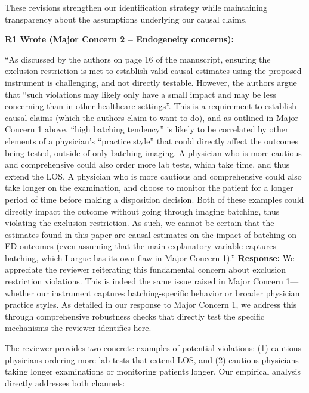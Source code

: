 \documentclass[11pt]{article}
\newenvironment{quote2}
{ \bigskip
\noindent
         \small\em
         \baselineskip=14pt
}
\newcommand{\1}{\hbox{\rm 1\kern-.35em 1}}
\begin{document}
{These revisions strengthen our identification strategy while maintaining transparency about the assumptions underlying our causal claims.

\color{black}




\begin{quote2}
\textbf{R1 Wrote (Major Concern 2 – Endogeneity concerns):}  

\noindent ``As discussed by the authors on page 16 of the manuscript, ensuring the exclusion restriction is met to establish valid causal estimates using the proposed instrument is challenging, and not directly testable. However, the authors argue that “such violations may likely only have a small impact and may be less concerning than in other healthcare settings”. This is a requirement to establish causal claims (which the authors claim to want to do), and as outlined in Major Concern 1 above, “high batching tendency” is likely to be correlated by other elements of a physician’s “practice style” that could directly affect the outcomes being tested, outside of only batching imaging. A physician who is more cautious and comprehensive could also order more lab tests, which take time, and thus extend the LOS. A physician who is more cautious and comprehensive could also take longer on the examination, and choose to monitor the patient for a longer period of time before making a disposition decision. Both of these examples could directly impact the outcome without going through imaging batching, thus violating the exclusion restriction. As such, we cannot be certain that the estimates found in this paper are causal estimates on the impact of batching on ED outcomes (even assuming that the main explanatory variable captures batching, which I argue has its own flaw in Major Concern 1).” 
\end{quote2}

\noindent\textbf{Response:} \color{blue}We appreciate the reviewer reiterating this fundamental concern about exclusion restriction violations. This is indeed the same issue raised in Major Concern 1—whether our instrument captures batching-specific behavior or broader physician practice styles. As detailed in our response to Major Concern 1, we address this through comprehensive robustness checks that directly test the specific mechanisms the reviewer identifies here.

The reviewer provides two concrete examples of potential violations: (1) cautious physicians ordering more lab tests that extend LOS, and (2) cautious physicians taking longer examinations or monitoring patients longer. Our empirical analysis directly addresses both channels:

}
\end{document}
